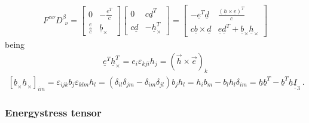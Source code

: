 \documentclass[letterpaper,10pt,english]{jupyterBook}
\begin{document}
\begin{equation}\label{equation:ch/relativity-special/notes:eq:energy-momentum-tensor:2}
\begin{split}F^{\alpha \nu} D^{\beta}_{\ \ \nu} =
  \begin{bmatrix} 0 & -\frac{\underline{e}^T}{c} \\ \frac{\underline{e}}{c} & \underline{b}_{\times} \end{bmatrix} 
  \begin{bmatrix} 0 & c \underline{d}^T \\ c \underline{d} & -\underline{h}^T_{\times} \end{bmatrix} = 
  \begin{bmatrix}
    - \underline{e}^T \underline{d} & \frac{\left( \underline{h} \times \underline{e} \right)^T}{c} \\
      c  \underline{b} \times \underline{d} & \underline{e} \underline{d}^T + \underline{b}_{\times} \underline{h}_{\times}
  \end{bmatrix}
\end{split}
\end{equation}
\sphinxAtStartPar
being
\begin{equation*}
\begin{split}\underline{e}^T \underline{h}^T_{\times} = e_i \varepsilon_{kji} h_j = \left( \vec{h} \times \vec{e} \right)_k\end{split}
\end{equation*}\begin{equation*}
\begin{split}\left[ \underline{b}_{\times} \underline{h}_{\times} \right]_{im} = \varepsilon_{ijk} b_{j} \varepsilon_{klm} h_{l} = \left( \delta_{il} \delta_{jm} - \delta_{im} \delta_{jl} \right) b_j h_l = h_i b_m - b_l h_l \delta_{im} = \underline{h} \underline{b}^T - \underline{b}^T \underline{h} \underline{\underline{I}}_3 \ .\end{split}
\end{equation*}\subsubsection*{Energy\sphinxhyphen{}stress tensor}
\end{document}
